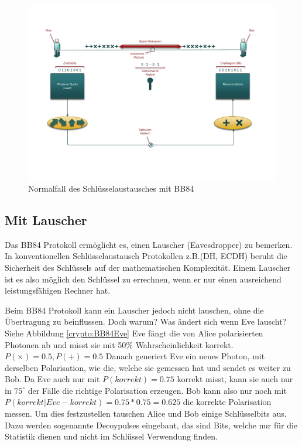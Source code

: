   \begin{figure}
    \centering
    \includegraphics[height=0.45\textheight]{crypto/BB84.pdf}
    \caption{Normalfall des Schl\"usselaustausches mit BB84\label{crypto:BB84KE}}
  \end{figure}

  \subsection{Mit Lauscher}
  Das BB84 Protokoll erm\"oglicht es, einen Lauscher (Eavesdropper) zu bemerken.
  In konventionellen Schl\"usselaustausch Protokollen z.B.(DH, ECDH)
  beruht die Sicherheit des Schl\"ussels auf der mathematischen Komplexit\"at.
  Einem Lauscher ist es also m\"oglich den Schl\"ussel zu errechnen,
  wenn er nur einen ausreichend leistungsf\"ahigen Rechner hat.

  Beim BB84 Protokoll kann ein Lauscher jedoch nicht lauschen, ohne die \"Ubertragung zu beinflussen.
  Doch warum? Was \"andert sich wenn Eve lauscht? Siehe Abbildung \ref{crypto:BB84Eve}
  Eve f\"angt die von Alice polarisierten Photonen ab und misst sie mit 50\% Wahrscheinlichkeit korrekt.
  $P(\times)=0.5, P(+)=0.5$
  Danach generiert Eve ein neues Photon, mit derselben Polarisation,
  wie die, welche sie gemessen hat und sendet es weiter zu Bob.
  Da Eve auch nur mit
  $P(korrekt)=0.75$
  korrekt misst, kann sie auch nur in
  $75^{\circ}$
  der F\"alle die richtige Polarisation erzeugen.
  Bob kann also nur noch mit
  $P(korrekt|Eve-korrekt)=0.75*0.75=0.625$
  die korrekte Polarisation messen.
  Um dies festzustellen tauschen Alice und Bob einige Schl\"usselbits aus.
  Dazu werden sogenannte Decoypulses eingebaut, das sind Bits,
  welche nur f\"ur die Statistik dienen und nicht im Schl\"ussel Verwendung finden.

